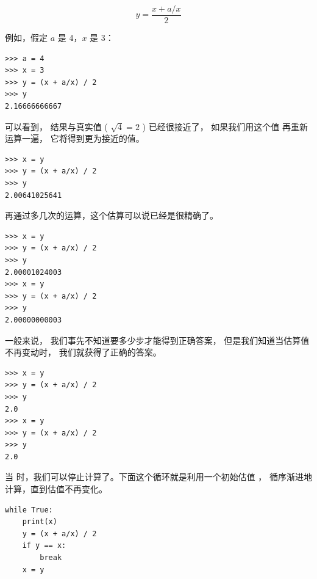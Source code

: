 \[ y = \frac{x + a/x}{2} \]

%

例如，假定 $a$ 是 4，$x$ 是 3：

\begin{lstlisting}
>>> a = 4
>>> x = 3
>>> y = (x + a/x) / 2
>>> y
2.16666666667
\end{lstlisting}

%

可以看到， 结果与真实值 ( $\sqrt{4} = 2$ ) 已经很接近了， 如果我们用这个值
再重新运算一遍， 它将得到更为接近的值。


\begin{lstlisting}
>>> x = y
>>> y = (x + a/x) / 2
>>> y
2.00641025641
\end{lstlisting}

%

再通过多几次的运算，这个估算可以说已经是很精确了。

\begin{lstlisting}
>>> x = y
>>> y = (x + a/x) / 2
>>> y
2.00001024003
>>> x = y
>>> y = (x + a/x) / 2
>>> y
2.00000000003
\end{lstlisting}

%

一般来说， 我们事先不知道要多少步才能得到正确答案， 但是我们知道当估算值不再变动时， 我们就获得了正确的答案。

\begin{lstlisting}
>>> x = y
>>> y = (x + a/x) / 2
>>> y
2.0
>>> x = y
>>> y = (x + a/x) / 2
>>> y
2.0
\end{lstlisting}

%

当  时，我们可以停止计算了。下面这个循环就是利用一个初始估值 ，
循序渐进地计算，直到估值不再变化。

\begin{lstlisting}
while True:
    print(x)
    y = (x + a/x) / 2
    if y == x:
        break
    x = y
\end{lstlisting}

